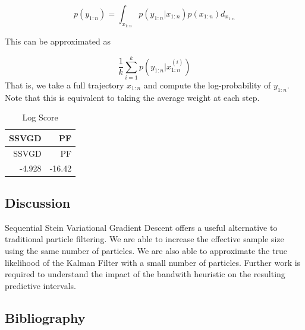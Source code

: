\documentclass[]{article}
\newenvironment{Shaded}{\begin{snugshade}}{\end{snugshade}}
\newcommand{\KeywordTok}[1]{\textcolor[rgb]{0.13,0.29,0.53}{\textbf{{#1}}}}
\newcommand{\DataTypeTok}[1]{\textcolor[rgb]{0.13,0.29,0.53}{{#1}}}
\newcommand{\DecValTok}[1]{\textcolor[rgb]{0.00,0.00,0.81}{{#1}}}
\newcommand{\StringTok}[1]{\textcolor[rgb]{0.31,0.60,0.02}{{#1}}}
\newcommand{\NormalTok}[1]{{#1}}
\begin{document}
\[p(y_{1:n}) = \int_{x_{1:n}} p(y_{1:n} | x_{1:n}) p(x_{1:n}) d_{x_{1:n}}\]

This can be approximated as

\[\frac{1}{k}\sum_{i=1}^k p(y_{1:n} | x^{(i)}_{1:n})\] That is, we take
a full trajectory \(x_{1:n}\) and compute the log-probability of
\(y_{1:n}\). Note that this is equivalent to taking the average weight
at each step.

\begin{Shaded}
\end{Shaded}

\begin{longtable}[]{@{}rr@{}}
\caption{Log Score}\tabularnewline
\toprule
SSVGD & PF\tabularnewline
\midrule
\endfirsthead
\toprule
SSVGD & PF\tabularnewline
\midrule
\endhead
-4.928 & -16.42\tabularnewline
\bottomrule
\end{longtable}

\subsection{Discussion}\label{discussion}

Sequential Stein Variational Gradient Descent offers a useful
alternative to traditional particle filtering. We are able to increase
the effective sample size using the same number of particles. We are
also able to approximate the true likelihood of the Kalman Filter with a
small number of particles. Further work is required to understand the
impact of the bandwith heuristic on the resulting predictive intervals.

\subsection{Bibliography}\label{bibliography}
\end{document}
